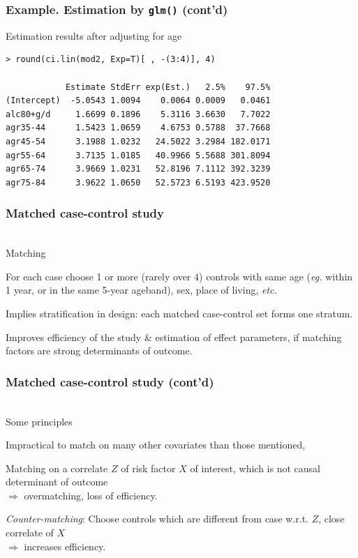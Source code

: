 \documentclass[handout,12pt]{beamer}
\begin{document}
\begin{frame}[fragile]
\frametitle{Example. Estimation by {\tt glm()} (cont'd)}

Estimation results after adjusting for age
{\small
\begin{verbatim}
> round(ci.lin(mod2, Exp=T)[ , -(3:4)], 4)

            Estimate StdErr exp(Est.)   2.5%    97.5%
(Intercept)  -5.0543 1.0094    0.0064 0.0009   0.0461
alc80+g/d     1.6699 0.1896    5.3116 3.6630   7.7022
agr35-44      1.5423 1.0659    4.6753 0.5788  37.7668
agr45-54      3.1988 1.0232   24.5022 3.2984 182.0171
agr55-64      3.7135 1.0185   40.9966 5.5688 301.8094
agr65-74      3.9669 1.0231   52.8196 7.1112 392.3239
agr75-84      3.9622 1.0650   52.5723 6.5193 423.9520

\end{verbatim}
}
\end{frame}


\begin{frame}
\frametitle{Matched case-control study}
\ \\
Matching
\bi
\item For each case choose 
    1 or more (rarely over $4$) controls with
      same age ({\it eg.} within 1 year, 
      or in the same 5-year ageband), 
      sex, place of living, {\it etc.} 
      \medskip
\item Implies stratification in design: 
each matched case-control set forms one stratum.
    \medskip
\item Improves efficiency of the study \& estimation of 
effect parameters, if matching factors are 
   strong determinants of outcome.
\ei
\end{frame} 


\begin{frame}
\frametitle{Matched case-control study (cont'd)}
\ \\
Some principles
\bi
\item Impractical to match on many other covariates than those mentioned,
\medskip
\item Matching on a correlate $Z$ of risk factor $X$ of interest, which is not 
	causal determinant of outcome \\
	 $\Rightarrow$ overmatching, loss of efficiency.
	\medskip
\item {\it Counter-matching}: Choose controls which are different from
	case w.r.t. $Z$, close correlate of $X$ \\
	 $\Rightarrow$ increases efficiency.
\ei
\end{frame} 
\end{document}

